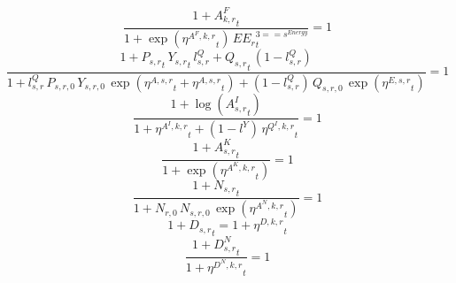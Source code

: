 \noindent[name= `sector TFP final demand 3 1']
\begin{dmath}
\frac{1+{{A^{F}_{k,r}}}_{t}}{1+\exp\left({{\eta^{A^F,k,r}}}_{t}\right)\, {{EE_r}}_{t}^{3=={{s^{Energy}}}}}=1
\end{dmath}
\noindent[name= `sector TFP 4 1']
\begin{dmath}
\frac{1+{{P_{s,r}}}_{t}\, {{Y_{s,r}}}_{t}\, {{l^{Q}_{s,r}}}+{{Q_{s,r}}}_{t}\, \left(1-{{l^{Q}_{s,r}}}\right)}{1+{{l^{Q}_{s,r}}}\, {{P_{s,r,0}}}\, {{Y_{s,r,0}}}\, \exp\left({{\eta^{A,s,r}}}_{t}+{{\eta^{A,s,r}}}_{t}\right)+\left(1-{{l^{Q}_{s,r}}}\right)\, {{Q_{s,r,0}}}\, \exp\left({{\eta^{E,s,r}}}_{t}\right)}=1
\end{dmath}
\noindent[name= `intermediate input productivity 4 1']
\begin{dmath}
\frac{1+\log\left({{A^{I}_{s,r}}}_{t}\right)}{1+{{\eta^{A^{I},k,r}}}_{t}+\left(1-{{l^{Y}}}\right)\, {{\eta^{Q^{I},k,r}}}_{t}}=1
\end{dmath}
\noindent[name= `capital productivity shock 4 1']
\begin{dmath}
\frac{1+{{A^{K}_{s,r}}}_{t}}{1+\exp\left({{\eta^{A^{K},k,r}}}_{t}\right)}=1
\end{dmath}
\noindent[name= `exogenous labour input 4 1']
\begin{dmath}
\frac{1+{{N_{s,r}}}_{t}}{1+{{N_{r,0}}}\, {{N_{s,r,0}}}\, \exp\left({{\eta^{A^{N},k,r}}}_{t}\right)}=1
\end{dmath}
\noindent[name= `TFP damage 4 1']
\begin{dmath}
1+{{D_{s,r}}}_{t}=1+{{\eta^{D,k,r}}}_{t}
\end{dmath}
\noindent[name= `labour damage 4 1']
\begin{dmath}
\frac{1+{{D^N_{s,r}}}_{t}}{1+{{\eta^{D^{N},k,r}}}_{t}}=1
\end{dmath}
\noindent[name= `capital damage 4 1']
